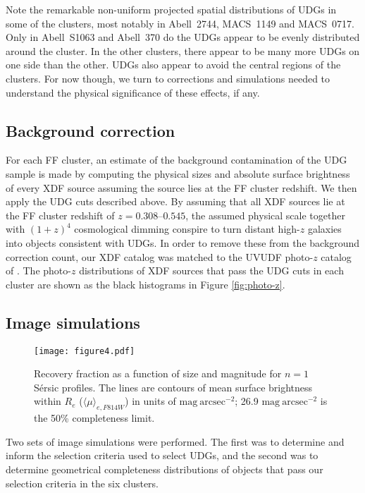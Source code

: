 \documentclass[iop,tighten,twocolumn,apj,floatfix]{emulateapj}
\begin{document}
Note the remarkable non-uniform projected spatial distributions of UDGs in some
of the clusters, most notably in Abell~2744, MACS~1149 and MACS~0717.
Only in Abell~S1063 and Abell~370 do the UDGs appear to be evenly distributed
around the cluster. In the other clusters, there appear to be many more UDGs
on one side than the other.
UDGs also appear to avoid the central regions of the clusters.
For now though, we turn to corrections and simulations needed to understand
the physical significance of these effects, if any.

\subsection{Background correction}

For each FF cluster, an estimate of the background contamination of the UDG
sample is made by computing the physical sizes and absolute surface
brightness of every XDF source assuming the source lies at the FF cluster
redshift.
We then apply the UDG cuts described above.
By assuming that all XDF sources lie at the FF cluster redshift of $z =
0.308$--$0.545$, the assumed physical scale together with $(1 + z)^4$
cosmological dimming conspire to turn distant high-$z$ galaxies into objects
consistent with UDGs.
In order to remove these from the background correction count, our XDF catalog
was matched to the UVUDF photo-$z$ catalog of \cite{rafelski2015}.
The photo-$z$ distributions of XDF sources that pass the UDG cuts in each
cluster are shown as the black histograms in Figure \ref{fig:photo-z}. 

\subsection{Image simulations}\label{sec:sims}

\begin{figure}[t]
	\texttt{[image: figure4.pdf]}
	\caption{
    \label{fig:completeness}
    Recovery fraction as a function of size and magnitude for $n=1$ S\'{e}rsic
    profiles. The lines are contours of mean surface brightness within $R_e$
    ($\langle\mu\rangle_{e,F814W}$) in units of
    $\mathrm{mag}~\mathrm{arcsec}^{-2}$; 26.9
    $\mathrm{mag}~\mathrm{arcsec}^{-2}$ is the 50\% completeness limit.
	}
\end{figure}

Two sets of image simulations were performed. The first was to determine and
inform the selection criteria used to select UDGs, and the second was to determine
geometrical completeness distributions of objects that pass our selection
criteria in the six clusters.
\end{document}
